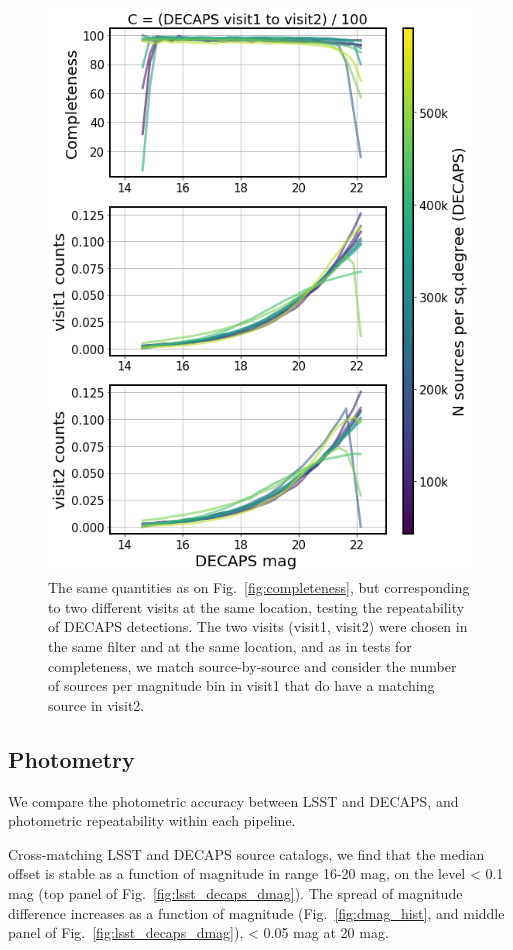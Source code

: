 \documentclass[DM,lsstdraft,toc,usenatbib]{lsstdoc}
\begin{document}
\begin{figure}
\begin{centering}
\includegraphics[width=0.75\columnwidth]{figs/completeness_3_decaps.png}
\caption{The same quantities as on Fig.~\ref{fig:completeness}, but corresponding to two different visits at the same location, testing the repeatability of DECAPS detections. The two visits (visit1, visit2) were chosen in the same filter and at the same location, and as in tests for completeness, we match source-by-source and consider the number of sources per magnitude bin in visit1 that do have a matching source in visit2. }
\label{fig:completeness_decaps}
\end{centering}
\end{figure} 





\subsection{Photometry}
\label{sec:photometry}

We compare the photometric accuracy between LSST and DECAPS, and  photometric repeatability within each pipeline.  

Cross-matching LSST and DECAPS source catalogs, we find that the median offset is stable as a function of magnitude in range 16-20 mag, on the level < 0.1 mag (top panel of Fig.~\ref{fig:lsst_decaps_dmag}).
The spread of magnitude difference increases as a function of magnitude (Fig.~\ref{fig:dmag_hist}, and middle panel of Fig.~\ref{fig:lsst_decaps_dmag}), < 0.05 mag at 20 mag.  
\end{document}
